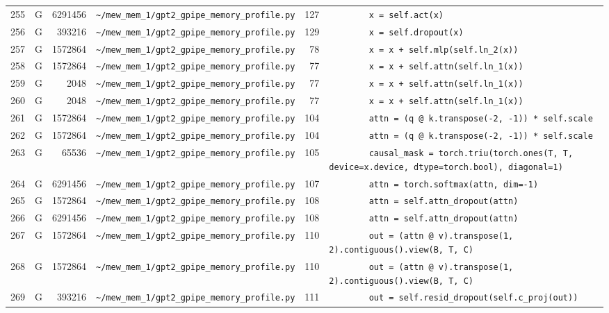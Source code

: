 \documentclass{article}
\begin{document}
\begin{longtable}{r l r p{6.5cm} r p{7.0cm}}
255 & G & 6291456 & \lstinline|~/mew_mem_1/gpt2_gpipe_memory_profile.py| & 127 & \lstinline|        x = self.act(x)| \\
256 & G & 393216 & \lstinline|~/mew_mem_1/gpt2_gpipe_memory_profile.py| & 129 & \lstinline|        x = self.dropout(x)| \\
257 & G & 1572864 & \lstinline|~/mew_mem_1/gpt2_gpipe_memory_profile.py| & 78 & \lstinline|        x = x + self.mlp(self.ln_2(x))| \\
258 & G & 1572864 & \lstinline|~/mew_mem_1/gpt2_gpipe_memory_profile.py| & 77 & \lstinline|        x = x + self.attn(self.ln_1(x))| \\
259 & G & 2048 & \lstinline|~/mew_mem_1/gpt2_gpipe_memory_profile.py| & 77 & \lstinline|        x = x + self.attn(self.ln_1(x))| \\
260 & G & 2048 & \lstinline|~/mew_mem_1/gpt2_gpipe_memory_profile.py| & 77 & \lstinline|        x = x + self.attn(self.ln_1(x))| \\
261 & G & 1572864 & \lstinline|~/mew_mem_1/gpt2_gpipe_memory_profile.py| & 104 & \lstinline|        attn = (q @ k.transpose(-2, -1)) * self.scale| \\
262 & G & 1572864 & \lstinline|~/mew_mem_1/gpt2_gpipe_memory_profile.py| & 104 & \lstinline|        attn = (q @ k.transpose(-2, -1)) * self.scale| \\
263 & G & 65536 & \lstinline|~/mew_mem_1/gpt2_gpipe_memory_profile.py| & 105 & \lstinline|        causal_mask = torch.triu(torch.ones(T, T, device=x.device, dtype=torch.bool), diagonal=1)| \\
264 & G & 6291456 & \lstinline|~/mew_mem_1/gpt2_gpipe_memory_profile.py| & 107 & \lstinline|        attn = torch.softmax(attn, dim=-1)| \\
265 & G & 1572864 & \lstinline|~/mew_mem_1/gpt2_gpipe_memory_profile.py| & 108 & \lstinline|        attn = self.attn_dropout(attn)| \\
266 & G & 6291456 & \lstinline|~/mew_mem_1/gpt2_gpipe_memory_profile.py| & 108 & \lstinline|        attn = self.attn_dropout(attn)| \\
267 & G & 1572864 & \lstinline|~/mew_mem_1/gpt2_gpipe_memory_profile.py| & 110 & \lstinline|        out = (attn @ v).transpose(1, 2).contiguous().view(B, T, C)| \\
268 & G & 1572864 & \lstinline|~/mew_mem_1/gpt2_gpipe_memory_profile.py| & 110 & \lstinline|        out = (attn @ v).transpose(1, 2).contiguous().view(B, T, C)| \\
269 & G & 393216 & \lstinline|~/mew_mem_1/gpt2_gpipe_memory_profile.py| & 111 & \lstinline|        out = self.resid_dropout(self.c_proj(out))| \\

\end{longtable}
\end{document}
